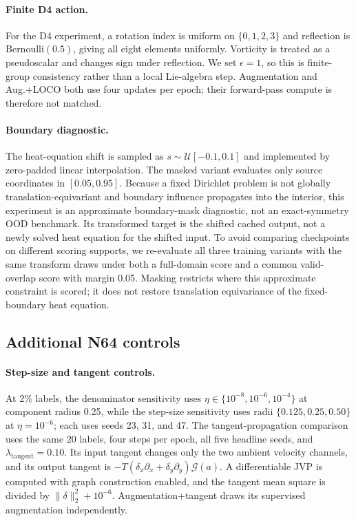 \paragraph{Finite D4 action.}
For the D4 experiment, a rotation index is uniform on
\(\{0,1,2,3\}\) and reflection is Bernoulli\((0.5)\), giving all eight elements
uniformly.  Vorticity is treated as a pseudoscalar and changes sign under reflection.
We set \(\epsilon=1\), so this is finite-group consistency rather than a local
Lie-algebra step.  Augmentation and Aug.+LOCO both use four updates per epoch; their
forward-pass compute is therefore not matched.

\paragraph{Boundary diagnostic.}
The heat-equation shift is sampled as \(s\sim\mathcal U[-0.1,0.1]\) and implemented
by zero-padded linear interpolation.  The masked variant evaluates only source
coordinates in \([0.05,0.95]\).  Because a fixed Dirichlet problem is not globally
translation-equivariant and boundary influence propagates into the interior, this
experiment is an approximate boundary-mask diagnostic, not an exact-symmetry OOD
benchmark.  Its transformed target is the shifted cached output, not a newly solved
heat equation for the shifted input.  To avoid comparing checkpoints on different
scoring supports, we re-evaluate all three training variants with the same transform
draws under both a full-domain score and a common valid-overlap score with margin
0.05.  Masking restricts where this approximate constraint is scored; it does not
restore translation equivariance of the fixed-boundary heat equation.

\subsection{Additional N64 controls}

\paragraph{Step-size and tangent controls.}
At 2\% labels, the denominator sensitivity uses
\(\eta\in\{10^{-8},10^{-6},10^{-4}\}\) at component radius 0.25, while the
step-size sensitivity uses radii \(\{0.125,0.25,0.50\}\) at \(\eta=10^{-6}\);
each uses seeds 23, 31, and 47.  The tangent-propagation comparison uses the same 20
labels, four steps per epoch, all five headline seeds, and
\(\lambda_{\mathrm{tangent}}=0.10\).  Its input tangent changes only the two ambient
velocity channels, and its output tangent is
\(-T(\delta_x\partial_x+\delta_y\partial_y)\mathcal G(a)\).  A differentiable JVP
is computed with graph construction enabled, and the tangent mean square is divided
by \(\lVert\delta\rVert_2^2+10^{-6}\).  Augmentation+tangent draws its supervised
augmentation independently.

